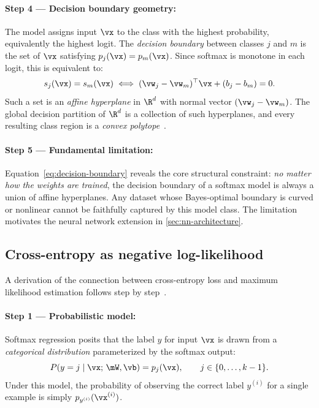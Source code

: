 \documentclass[sigconf,screen,nonacm]{acmart}
\begin{document}
\paragraph{Step 4 --- Decision boundary geometry:}
The model assigns input $\vx$ to the class with the highest probability, equivalently the highest logit. The \emph{decision boundary} between classes $j$ and $m$ is the set of $\vx$ satisfying $p_j(\vx) = p_m(\vx)$. Since softmax is monotone in each logit, this is equivalent to:
\begin{equation}
    s_j(\vx) = s_m(\vx)
    \;\Longleftrightarrow\;
    (\vw_j - \vw_m)^\top \vx + (b_j - b_m) = 0.
    \label{eq:decision-boundary}
\end{equation}
Such a set is an \emph{affine hyperplane} in $\R^d$ with normal vector $(\vw_j - \vw_m)$. The global decision partition of $\R^d$ is a collection of such hyperplanes, and every resulting class region is a \emph{convex polytope}~\cite{deisenroth2020mml}.

\paragraph{Step 5 --- Fundamental limitation:}
Equation~\eqref{eq:decision-boundary} reveals the core structural constraint: \emph{no matter how the weights are trained}, the decision boundary of a softmax model is always a union of affine hyperplanes. Any dataset whose Bayes-optimal boundary is curved or nonlinear cannot be faithfully captured by this model class. The limitation motivates the neural network extension in \cref{sec:nn-architecture}.

\subsection{Cross-entropy as negative log-likelihood}
\label{sec:cross-entropy-nll}

A derivation of the connection between cross-entropy loss and maximum likelihood estimation follows step by step~\cite{murphy2022pml,goodfellow2016deep}.

\paragraph{Step 1 --- Probabilistic model:}
Softmax regression posits that the label $y$ for input $\vx$ is drawn from a \emph{categorical distribution} parameterized by the softmax output:
\begin{equation}
    P(y = j \mid \vx;\,\mW,\vb) = p_j(\vx), \qquad j \in \{0, \ldots, k-1\}.
    \label{eq:categorical}
\end{equation}
Under this model, the probability of observing the correct label $y^{(i)}$ for a single example is simply $p_{y^{(i)}}(\vx^{(i)})$.
\end{document}
